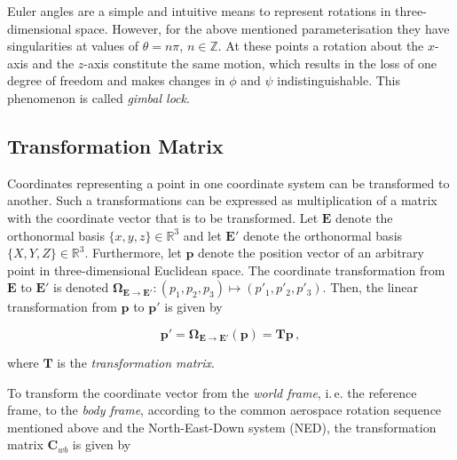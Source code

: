 Euler angles are a simple and intuitive means to represent rotations in three-dimensional space. However, for the above mentioned parameterisation they have singularities at values of $\theta = n \pi$, $n \in \mathbb{Z}$. At these points a rotation about the $x$-axis and the $z$-axis constitute the same motion, which results in the loss of one degree of freedom and makes changes in $\phi$ and $\psi$ indistinguishable. This phenomenon is called \emph{gimbal lock}.

\subsection{Transformation Matrix}

Coordinates representing a point in one coordinate system can be transformed to another. Such a transformations can be expressed as multiplication of a matrix with the coordinate vector that is to be transformed. Let $\mathbf{E}$ denote the orthonormal basis $\{x, y, z\} \in \mathbb{R}^3$ and let $\mathbf{E}'$ denote the orthonormal basis $\{X, Y, Z\} \in \mathbb{R}^3$. Furthermore, let $\mathbf{p}$ denote the position vector of an arbitrary point in three-dimensional Euclidean space. The coordinate transformation from $\mathbf{E}$ to $\mathbf{E}'$ is denoted $\bm{\Omega}_{\mathbf{E} \rightarrow \mathbf{E}'}: (p_1, p_2, p_3) \mapsto (p'_1, p'_2, p'_3)$. Then, the linear transformation from $\mathbf{p}$ to $\mathbf{p}'$ is given by

\begin{equation}\label{eq:transformation}
  \mathbf{p'} = \bm{\Omega}_{\mathbf{E} \rightarrow \mathbf{E}'}(\mathbf{p}) = \mathbf{T} \mathbf{p}\,,
\end{equation}

\noindent
where $\mathbf{T}$ is the \emph{transformation matrix}.

To transform the coordinate vector from the \emph{world frame}, i.\,e. the reference frame, to the \emph{body frame}, according to the common aerospace rotation sequence mentioned above and the North-East-Down system (NED), the transformation matrix $\mathbf{C}_{wb}$ is given by

